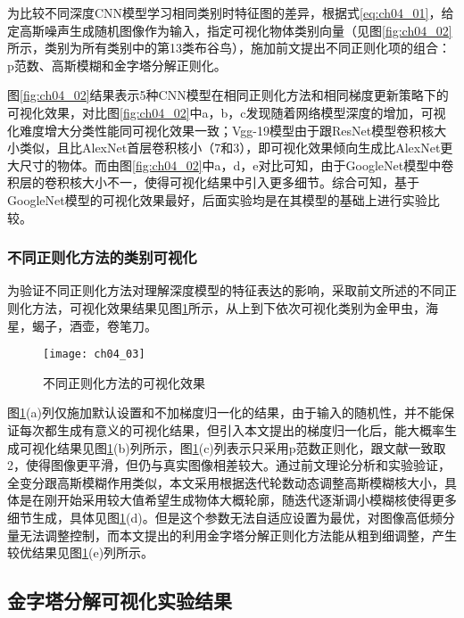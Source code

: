 为比较不同深度CNN模型学习相同类别时特征图的差异，根据式\ref{eq:ch04_01}，给定高斯噪声生成随机图像作为输入，指定可视化物体类别向量（见图\ref{fig:ch04_02}所示，类别为所有类别中的第13类布谷鸟），施加前文提出不同正则化项的组合：p范数、高斯模糊和金字塔分解正则化。


图\ref{fig:ch04_02}结果表示5种CNN模型在相同正则化方法和相同梯度更新策略下的可视化效果，对比图\ref{fig:ch04_02}中a，b，c发现随着网络模型深度的增加，可视化难度增大分类性能同可视化效果一致；Vgg-19模型由于跟ResNet模型卷积核大小类似，且比AlexNet首层卷积核小（7和3），即可视化效果倾向生成比AlexNet更大尺寸的物体。而由图\ref{fig:ch04_02}中a，d，e对比可知，由于GoogleNet模型中卷积层的卷积核大小不一，使得可视化结果中引入更多细节。综合可知，基于GoogleNet模型的可视化效果最好，后面实验均是在其模型的基础上进行实验比较。

\subsubsection{ 不同正则化方法的类别可视化}
为验证不同正则化方法对理解深度模型的特征表达的影响，采取前文所述的不同正则化方法，可视化效果结果见图\ref{fig:ch04_03}所示，从上到下依次可视化类别为金甲虫，海星，蝎子，酒壶，卷笔刀。
 
\begin{figure}[!htbp]
\centering
\texttt{[image: ch04\_03]}
\caption{不同正则化方法的可视化效果}
\label{fig:ch04_03}
\end{figure}

图\ref{fig:ch04_03}(a)列仅施加默认设置和不加梯度归一化的结果，由于输入的随机性，并不能保证每次都生成有意义的可视化结果，但引入本文提出的梯度归一化后，能大概率生成可视化结果见图\ref{fig:ch04_03}(b)列所示，图\ref{fig:ch04_03}(c)列表示只采用p范数正则化，跟文献一致取2，使得图像更平滑，但仍与真实图像相差较大。通过前文理论分析和实验验证，全变分跟高斯模糊作用类似，本文采用根据迭代轮数动态调整高斯模糊核大小，具体是在刚开始采用较大值希望生成物体大概轮廓，随迭代逐渐调小模糊核使得更多细节生成，具体见图\ref{fig:ch04_03}(d)。但是这个参数无法自适应设置为最优，对图像高低频分量无法调整控制，而本文提出的利用金字塔分解正则化方法能从粗到细调整，产生较优结果见图\ref{fig:ch04_03}(e)列所示。

\subsection{金字塔分解可视化实验结果}

